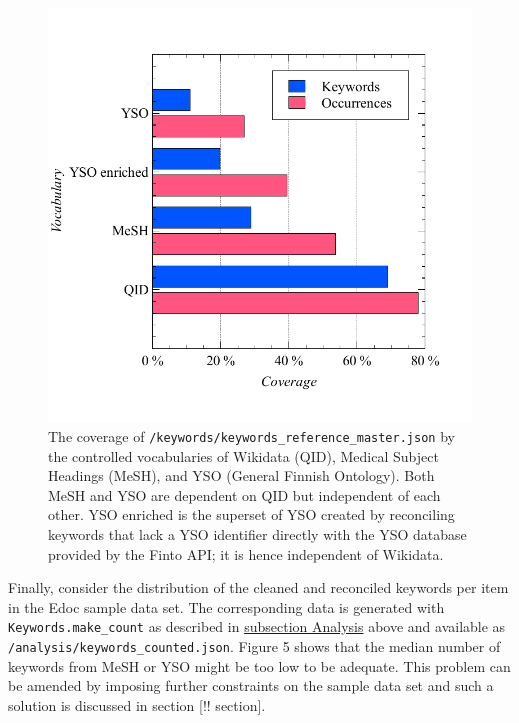 \begin{figure}
\centering
\includegraphics{images/native_gold_standard.pdf}
\caption{The coverage of
\texttt{/keywords/keywords\_reference\_master.json} by the controlled
vocabularies of Wikidata (QID), Medical Subject Headings (MeSH), and YSO
(General Finnish Ontology). Both MeSH and YSO are dependent on QID but
independent of each other. YSO enriched is the superset of YSO created
by reconciling keywords that lack a YSO identifier directly with the YSO
database provided by the Finto API; it is hence independent of
Wikidata.}
\end{figure}

Finally, consider the distribution of the cleaned and reconciled
keywords per item in the Edoc sample data set. The corresponding data is
generated with \texttt{Keywords.make\_count} as described in
\protect\hyperlink{analysis}{subsection Analysis} above and available as
\texttt{/analysis/keywords\_counted.json}. Figure 5 shows that the
median number of keywords from MeSH or YSO might be too low to be
adequate. This problem can be amended by imposing further constraints on
the sample data set and such a solution is discussed in section {[}!!
section{]}.

